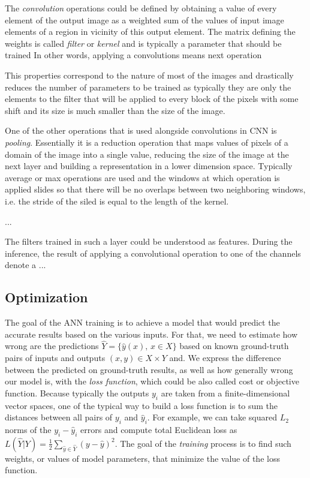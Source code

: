 The \textit{convolution} operations could be defined by obtaining a value of every element of the output image as a weighted sum of the values of input image elements of a region in vicinity of this output element.
The matrix defining the weights is called \textit{filter} or \textit{kernel} and is typically a parameter that should be trained
In other words, applying a convolutions means next operation

This properties correspond to the nature of most of the images and drastically reduces the number of parameters to be trained as typically they are only the elements to the filter that will be applied to every block of the pixels with some shift and its size is much smaller than the size of the image.

One of the other operations that is used alongside convolutions in CNN is \textit{pooling}.
Essentially it is a reduction operation that maps values of pixels of a domain of the image into a single value, reducing the size of the image at the next layer and building a representation in a lower dimension space. 
Typically average or max operations are used and the windows at which operation is applied slides so that there will be no overlaps between two neighboring windows, i.e. the stride of the siled is equal to the length of the kernel.

...


The filters trained in such a layer could be understood as features. 
During the inference, the result of applying a convolutional operation to one of the channels denote a ...


\subsection{Optimization}

The goal of the ANN training is to achieve a model that would predict the accurate results based on the various inputs.
For that, we need to estimate how wrong are the predictions $\hat{Y} = \{\hat{y}(x), \, x \in X \}$ based on known ground-truth pairs of inputs and outputs $ (x, y) \in X \times Y $ and.
We express the difference between the predicted on ground-truth results, as well as how generally wrong our model is, with the \textit{loss function}, which could be also called cost or objective function.
Because typically the outputs $y_{i}$ are taken from a finite-dimensional vector spaces, one of the typical way to build a loss function is to sum the distances between all pairs of $y_{i}$ and $\hat{y}_{i}$.
For example, we can take squared $L_{2}$ norms of the $y_{i}-\hat{y}_{i}$ errors and compute total Euclidean loss as $ L(\hat{Y}|Y) = \frac{1}{2}\sum_{\hat{y} \in \hat{Y}}(y - \hat{y})^{2} $.
The goal of the \textit{training} process is to find such weights, or values of model parameters, that minimize the value of the loss function.

